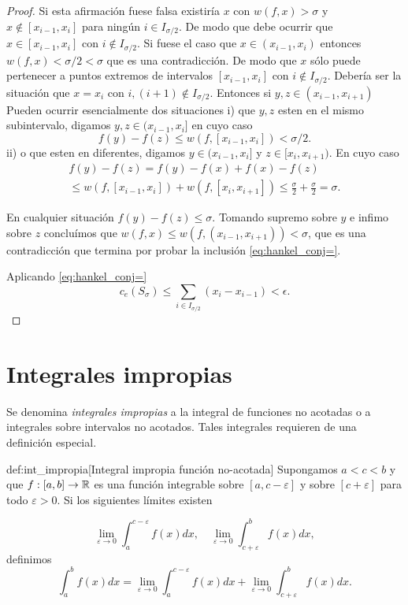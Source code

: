 \begin{proof}
Si esta afirmación fuese falsa existiría $x$ con $w(f,x)>\sigma$ y $x\notin [x_{i-1},x_i]$ para ningún $i\in I_{\sigma/2}$. De modo que debe ocurrir que $x\in   [x_{i-1},x_i]$ con $i\notin I_{\sigma/2}$. Si fuese el caso que  $x\in   (x_{i-1},x_i)$ entonces  $w(f,x)<\sigma/2<\sigma$ que es una contradicción. De modo que $x$ sólo puede pertenecer a puntos extremos de intervalos  $[x_{i-1},x_i]$ con  $i\notin I_{\sigma/2}$. Debería ser la situación que $x=x_i$ con $i,(i+1)\notin I_{\sigma/2}$. Entonces si $y,z  \in (x_{i-1},x_{i+1})$ Pueden ocurrir esencialmente dos situaciones i) que $y,z$ esten en el mismo subintervalo, digamos  $y,z \in (x_{i-1},x_{i}]$ en cuyo caso
\[
 f(y)-f(z)\leq w(f, [x_{i-1},x_{i}])<\sigma/2.
\]
ii) o que esten en diferentes, digamos $y\in  (x_{i-1},x_{i}]$ y $z \in [x_{i},x_{i+1})$. En cuyo caso
\begin{multline*}
 f(y)-f(z)=f(y)-f(x)+f(x)-f(z)\\
 \leq w(f,[x_{i-1},x_i])+w(f,[x_{i},x_{i+1}])\leq\frac{\sigma}{2}+\frac{\sigma}{2}=\sigma.
\end{multline*}

En cualquier situación $f(y)-f(z)\leq\sigma$. Tomando supremo sobre $y$ e infimo sobre $z$ concluímos que $w(f,x)\leq w(f,(x_{i-1},x_{i+1}))<\sigma$, que es una contradicción que termina por probar la inclusión  \eqref{eq:hankel_conj=}. 

Aplicando \eqref{eq:hankel_conj=}
\[
 c_e(S_{\sigma})\leq  \sum_{i\in I_{\sigma/2}}(x_i-x_{i-1})<\epsilon.
\] 
\end{proof}

   
   
\section{Integrales impropias}
Se denomina \emph{integrales impropias} a la integral de funciones no acotadas o a integrales sobre intervalos no acotados. Tales integrales requieren de una definición especial.
\begin{definicion}{def:int_impropia}[Integral impropia función no-acotada] Supongamos $a<c<b$ y que $f:[a,b]\to\mathbb{R}$ es una función integrable sobre $[a,c-\varepsilon]$ y sobre $[c+\varepsilon]$ para todo $\varepsilon>0$. Si los siguientes límites existen

\[
 \lim_{\varepsilon\to 0}\int_a^{c-\varepsilon}f(x)dx,\quad \lim_{\varepsilon\to 0}\int_{c+\varepsilon}^bf(x)dx,
\]
definimos 
\begin{equation}\label{eq:int_impro}
 \int_a^bf(x)dx= \lim_{\varepsilon\to 0}\int_a^{c-\varepsilon}f(x)dx+ \lim_{\varepsilon\to 0}\int_{c+\varepsilon}^bf(x)dx.
\end{equation}



 
\end{definicion}

